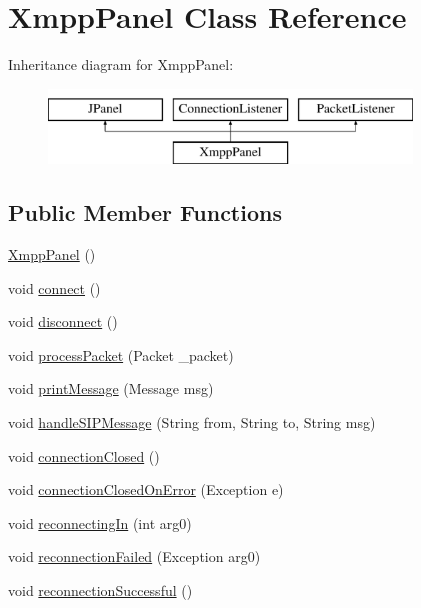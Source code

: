 \hypertarget{class_xmpp_panel}{\section{Xmpp\-Panel Class Reference}
\label{class_xmpp_panel}
}
Inheritance diagram for Xmpp\-Panel\-:\begin{figure}[H]
\begin{center}
\leavevmode
\includegraphics[height=2.000000cm]{class_xmpp_panel}
\end{center}
\end{figure}
\subsection*{Public Member Functions}
\begin{DoxyCompactItemize}
\item 
\hyperlink{class_xmpp_panel_ac5b14d011dd4026fea53170e964bf813}{Xmpp\-Panel} ()
\item 
void \hyperlink{class_xmpp_panel_acada2a79f10e0b6e5f2cf6535104be30}{connect} ()
\item 
void \hyperlink{class_xmpp_panel_a02332fc3d9686cb9925d2bf8306056ac}{disconnect} ()
\item 
void \hyperlink{class_xmpp_panel_a9e1f0acb190d4dfee461e826a91c94e1}{process\-Packet} (Packet \-\_\-packet)
\item 
void \hyperlink{class_xmpp_panel_ac1997ba5748cb37e56f6fe6077526686}{print\-Message} (Message msg)
\item 
void \hyperlink{class_xmpp_panel_af8b1ba7401072826d2597d7d1f7dac55}{handle\-S\-I\-P\-Message} (String from, String to, String msg)
\item 
void \hyperlink{class_xmpp_panel_adec04fbc8bdf3b4491053f807355495c}{connection\-Closed} ()
\item 
void \hyperlink{class_xmpp_panel_a6b48430c1581bcbc5e4e0d64d5bf0cd9}{connection\-Closed\-On\-Error} (Exception e)
\item 
void \hyperlink{class_xmpp_panel_a40cc8a2244f1f4d66deaffd1d3c902b9}{reconnecting\-In} (int arg0)
\item 
void \hyperlink{class_xmpp_panel_a0b366ab50c94adb915e3861eac9328d8}{reconnection\-Failed} (Exception arg0)
\item 
void \hyperlink{class_xmpp_panel_a26e92a93633b405e79de1bedfc88f93e}{reconnection\-Successful} ()
\end{DoxyCompactItemize}
